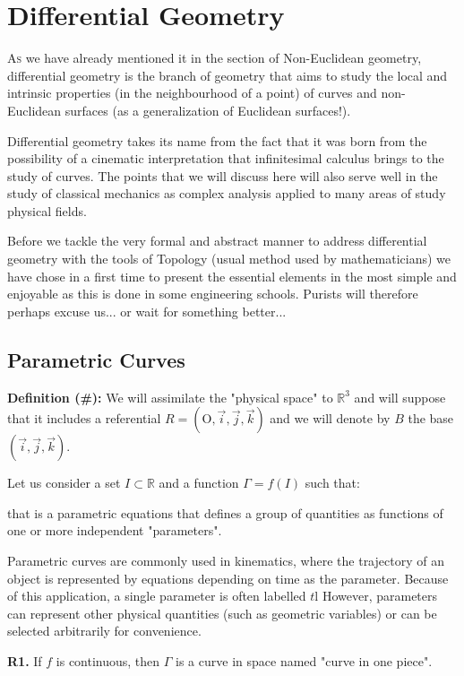 {	%
	\newpage
	\thispagestyle{empty}
	\mbox{}
	\section{Differential Geometry}\label{differential geometry}
	\lettrine[lines=4]{\color{BrickRed}A}s we have already mentioned it in the section of Non-Euclidean geometry, differential geometry is the branch of geometry that aims to study the local and intrinsic  properties (in the neighbourhood of a point) of curves and non-Euclidean surfaces (as a generalization of Euclidean surfaces!).
	
	Differential geometry takes its name from the fact that it was born from the possibility of a cinematic interpretation that infinitesimal calculus brings to the study of curves. The points that we will discuss here will also serve well in the study of classical mechanics as complex analysis applied to many areas of study physical fields.
	
	\begin{tcolorbox}[title=Remark,colframe=black,arc=10pt]
	Before we tackle the very formal and abstract manner to address differential geometry with the tools of Topology (usual method used by mathematicians) we have chose in a first time to present the essential elements in the most simple and enjoyable as this is done in some engineering schools. Purists will therefore perhaps excuse us... or  wait for something better...
	\end{tcolorbox}	
	
	\subsection{Parametric Curves}\label{parametric curves}
	\textbf{Definition (\#\mydef):} We will assimilate the "physical space" to $\mathbb{R}^3$ and will suppose that it includes a referential $R=(\text{O},\vec{i},\vec{j},\vec{k})$ and we will denote by $B$ the base $(\vec{i},\vec{j},\vec{k})$.
	
	Let us consider a set $I \subset \mathbb{R}$ and a function $\Gamma=f(I)$ such that:
	
	that is a parametric equations that defines a group of quantities as functions of one or more independent "parameters".
	
	Parametric curves are commonly used in kinematics, where the trajectory of an object is represented by equations depending on time as the parameter. Because of this application, a single parameter is often labelled $t$l However, parameters can represent other physical quantities (such as geometric variables) or can be selected arbitrarily for convenience.
	\begin{tcolorbox}[title=Remarks,colframe=black,arc=10pt]
	\textbf{R1.} If $f$ is continuous, then $\Gamma$ is a curve in space named "curve in one piece".\\
	

\end{tcolorbox}}
